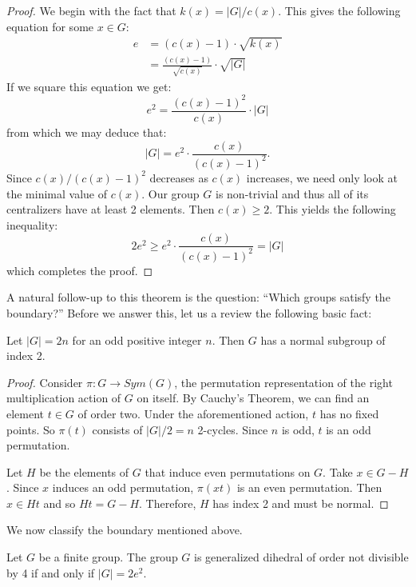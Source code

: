 \documentclass[main.tex]{subfiles}
\begin{document}
\begin{proof}
We begin with the fact that $k(x) = |G|/c(x)$. This gives the following equation for some $x \in G$:
\begin{align*}
e &= (c(x) - 1) \cdot \sqrt{k(x)} \\
&= \frac{(c(x) - 1)}{\sqrt{c(x)}} \cdot \sqrt{|G|}
\end{align*}
If we square this equation we get:
$$e^2 = \frac{(c(x) - 1)^2}{c(x)} \cdot |G|$$
from which we may deduce that:
$$|G| = e^2 \cdot \frac{c(x)}{(c(x) -1)^2}\text{.}$$
Since $c(x)/(c(x) - 1)^2$ decreases as $c(x)$ increases, we need only look at the minimal value of $c(x)$. Our group $G$ is non-trivial and thus all of its centralizers have at least 2 elements. Then $c(x) \ge 2$. This yields the following inequality:
$$2e^2 \ge e^2 \cdot \frac{c(x)}{(c(x) - 1)^2} = |G|$$
which completes the proof.
\end{proof}

A natural follow-up to this theorem is the question: ``Which groups satisfy the boundary?'' Before we answer this, let us a review the following basic fact:

\begin{lemma}\label{ordernormal}
Let $|G| = 2n$ for an odd positive integer $n$. Then $G$ has a normal subgroup of index 2. 
\end{lemma}

\begin{proof}
Consider $\pi: G \to Sym(G)$, the permutation representation of the right multiplication action of $G$ on itself. By Cauchy's Theorem, we can find an element $t \in G$ of order two. Under the aforementioned action, $t$ has no fixed points. So $\pi(t)$ consists of $|G|/2 = n$ 2-cycles. Since $n$ is odd, $t$ is an odd permutation.

Let $H$ be the elements of $G$ that induce even permutations on $G$. Take $x \in G - H$. Since $x$ induces an odd permutation, $\pi(xt)$ is an even permutation. Then $x \in Ht$ and so $Ht = G- H$. Therefore, $H$ has index 2 and must be normal.
\end{proof}

We now classify the boundary mentioned above.

\begin{theorem}\label{boundaryclassification}
Let $G$ be a finite group. The group $G$ is generalized dihedral of order not divisible by 4 if and only if $|G| = 2e^2$. 
\end{theorem}
\end{document}
